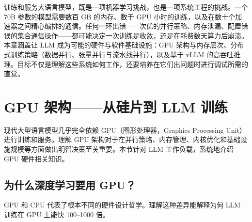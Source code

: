 训练和服务大语言模型，既是一项机器学习挑战，也是一项系统工程的挑战。一个 70B 参数的模型需要数百 GB 的内存、数千 GPU 小时的训练，以及在数十个加速器之间精心编排的通信。任何一环出错——次优的并行策略、内存泄漏、配置错误的集合通信操作——都可能决定一次训练是收敛，还是在耗费数天算力后崩溃。本章涵盖让 LLM 成为可能的硬件与软件基础设施：GPU 架构与内存层次、分布式训练策略（数据并行、张量并行与流水线并行），以及基于 vLLM 的高吞吐推理。目标不仅是理解这些系统如何工作，还要培养在它们出问题时进行调试所需的直觉。

\section{GPU 架构——从硅片到 LLM 训练}
\label{gpu-architecture-from-silicon-to-llm-training}

现代大型语言模型几乎完全依赖 GPU（图形处理器，Graphics Processing Unit）进行训练和服务。理解 GPU 架构对于在并行策略、内存管理、内核优化和基础设施规模等方面做出明智决策至关重要。本节针对 LLM 工作负载，系统地介绍 GPU 硬件相关知识。

\subsection{为什么深度学习要用 GPU？}
\label{why-gpus-for-deep-learning}

GPU 和 CPU 代表了根本不同的硬件设计哲学。理解这种差异能解释为何 LLM 训练在 GPU 上能快 100--1000 倍。

